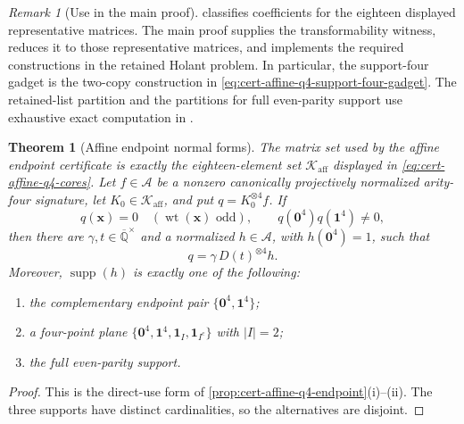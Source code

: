 \documentclass[11pt,letterpaper,onecolumn]{article}
\theoremstyle{plain}
\newtheorem{theorem}{Theorem}[section]
\theoremstyle{definition}
\theoremstyle{remark}
\newtheorem{remark}[remark]{Remark}
\newcommand{\AlgNums}{\overline{\mathbb Q}}
\newcommand{\cA}{\mathscr A}
\newcommand{\wt}{\operatorname{wt}}
\newcommand{\supp}{\operatorname{supp}}
\newcommand{\one}{\mathbf 1}
\newcommand{\zero}{\mathbf 0}
\begin{document}
\begin{remark}[Use in the main proof]
\label{rem:cert-affine-q4-endpoint-scope}
 classifies coefficients for the eighteen
displayed representative matrices.  The main proof supplies the transformability witness,
reduces it to those representative matrices, and implements the required constructions in
the retained Holant problem.  In particular, the support-four gadget is
the two-copy construction in
\cref{eq:cert-affine-q4-support-four-gadget}.  The retained-list partition and the partitions for full even-parity support use exhaustive exact computation in
. 
\end{remark}

\begin{theorem}[Affine endpoint normal forms]
\label{thm:cert-interface-affine-q4-normal-form}
The matrix set used by the affine endpoint certificate is exactly the
eighteen-element set \(\mathscr K_{\mathrm{aff}}\) displayed in
\cref{eq:cert-affine-q4-cores}.  Let \(f\in\cA\) be a nonzero canonically
projectively normalized arity-four signature, let
\(K_0\in\mathscr K_{\mathrm{aff}}\), and put \(q=K_0^{\otimes4}f\).  If
\[
 q({\mathbf{x}})=0\quad(\wt({\mathbf{x}})\text{ odd}),\qquad
 q(\zero^4)q(\one^4)\ne0,
\]
then there are \(\gamma,t\in\AlgNums^\times\) and a normalized
\(h\in\cA\), with \(h(\zero^4)=1\), such that
\[
 q=\gamma\,D(t)^{\otimes4}h.
\]
Moreover, \(\supp(h)\) is exactly one of the following:
\begin{enumerate}[label=\textnormal{(\roman*)}]
\item the complementary endpoint pair \(\{\zero^4,\one^4\}\);
\item a four-point plane
      \(\{\zero^4,\one^4,\one_I,\one_{I^c}\}\) with \(|I|=2\);
\item the full even-parity support.
\end{enumerate}
\end{theorem}

\begin{proof}
This is the direct-use form of
\cref{prop:cert-affine-q4-endpoint}\textnormal{(i)--(ii)}.  The three
supports have distinct cardinalities, so the alternatives are disjoint.
\end{proof}
\end{document}
